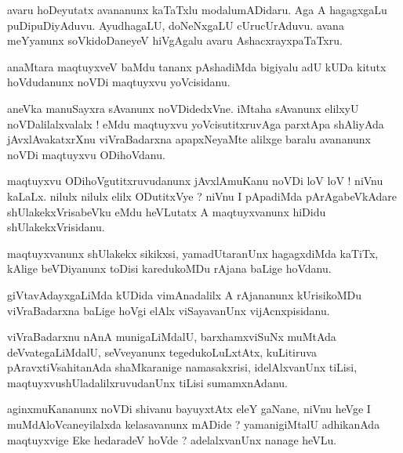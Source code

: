 \documentclass{article}
\begin{document}
\begin{mn}
avaru  hoDeyutatx  avananunx  kaTaTxlu  modalumADidaru.  Aga  A  hagagxgaLu  puDipuDiyAduvu.  AyudhagaLU,  
doNeNxgaLU  cUrucUrAduvu.  avana  meYyanunx  soVkidoDaneyeV  hiVgAgalu  avaru  AshacxrayxpaTaTxru.
\end{mn}

\begin{mn}
anaMtara  maqtuyxveV  baMdu  tananx  pAshadiMda  bigiyalu  adU  kUDa  kitutx hoVdudanunx  noVDi  maqtuyxvu  yoVcisidanu.
\end{mn}

\begin{mn}
aneVka  manuSayxra  sAvanunx  noVDidedxVne.  iMtaha  sAvanunx  elilxyU  noVDalilalxvalalx !  eMdu  maqtuyxvu  yoVcisutitxruvAga  
parxtApa shAliyAda  jAvxlAvakatxrXnu  viVraBadarxna  apapxNeyaMte  alilxge  baralu  avananunx  noVDi  maqtuyxvu  ODihoVdanu.
\end{mn}

\begin{mn}
maqtuyxvu  ODihoVgutitxruvudanunx  jAvxlAmuKanu  noVDi  loV  loV !  niVnu  kaLaLx.  nilulx  nilulx  elilx  ODutitxVye ?  
niVnu  I  pApadiMda  pArAgabeVkAdare  shUlakekxVrisabeVku  eMdu  heVLutatx  A  maqtuyxvanunx  hiDidu  shUlakekxVrisidanu.
\end{mn}

\begin{mn}
maqtuyxvanunx  shUlakekx  sikikxsi,  yamadUtaranUnx  hagagxdiMda  kaTiTx,  kAlige  beVDiyanunx  toDisi  
karedukoMDu  rAjana  baLige  hoVdanu.
\end{mn}

\begin{mn}
giVtavAdayxgaLiMda  kUDida  vimAnadalilx  A  rAjananunx  kUrisikoMDu  viVraBadarxna  baLige  hoVgi  
elAlx  viSayavanUnx  vijAcnxpisidanu.
\end{mn}

\begin{mn}
viVraBadarxnu  nAnA  munigaLiMdalU,  barxhamxviSuNx  muMtAda  deVvategaLiMdalU,  seVveyanunx  tegedukoLuLxtAtx,  kuLitiruva  
pAravxtiVsahitanAda  shaMkaranige  namasakxrisi,  idelAlxvanUnx  tiLisi,  maqtuyxvushUladalilxruvudanUnx  tiLisi  sumamxnAdanu.
\end{mn}

\begin{mn}
aginxmuKananunx  noVDi  shivanu  bayuyxtAtx  eleY  gaNane,  niVnu  heVge  I  muMdAloVcaneyilalxda  kelasavanunx  mADide ?  
yamanigiMtalU  adhikanAda  maqtuyxvige  Eke  hedaradeV  hoVde ?  adelalxvanUnx  nanage  heVLu.
\end{mn}
\end{document}

